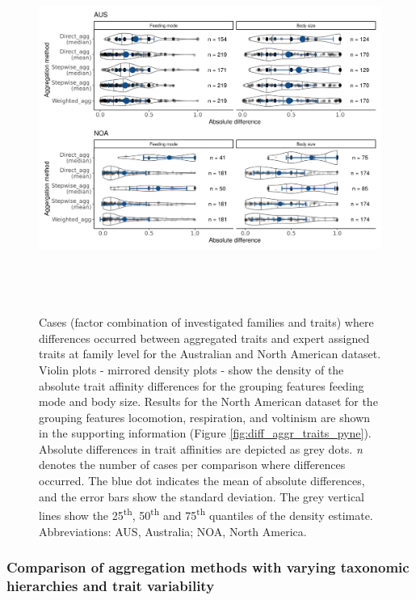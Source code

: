 \documentclass{article}
\begin{document}
\newpage

\begin{figure}[H]
  \centering
  \includegraphics[width=16.5cm, height=12cm]{Deviances_trait_agg_combined.png}
  \caption{Cases (factor combination of investigated families and traits) where differences occurred between aggregated traits and expert assigned traits at family level for the Australian and North American dataset. Violin plots - mirrored density plots - show the density of the absolute trait affinity differences for the grouping features feeding mode and body size. Results for the North American dataset for the grouping features locomotion, respiration, and voltinism are shown in the supporting information (Figure \ref{fig:diff_aggr_traits_pyne}). Absolute differences in trait affinities are depicted as grey dots. \textit{n} denotes the number of cases per comparison where differences occurred. The blue dot indicates the mean of absolute differences, and the error bars show the standard deviation. The grey vertical lines show the 25\textsuperscript{th}, 50\textsuperscript{th} and 75\textsuperscript{th} quantiles of the density estimate. Abbreviations: AUS, Australia; NOA, North America.}
  \label{fig:diff_aggr_traits_combined}
\end{figure}

\newpage 


\subsubsection*{Comparison of aggregation methods with varying taxonomic hierarchies and trait variability}
\end{document}
